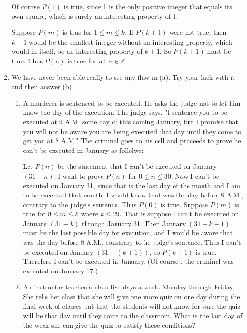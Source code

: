 \documentclass[10pt,letterpaper]{article}
\begin{document}
\begin{enumerate}
  Of course $P(1)$ is true, since 1 is the only positive integer that equals its own square, which is surely an interesting property of 1.
  
  Suppose $P(m)$ is true for $1 \le m \le k$. If $P(k+1)$ were not true, then $k+1$ would be the smallest integer without an interesting property, 
  which would in itself, be an interesting property of $k+1$. So $P(k+1)$ must be true. Thus $P(n)$ is true for all $n \in \mathbb{Z}^+$
  
  \item We have never been able really to see any flaw in (a). Try your luck with it and then answer (b)
  \begin{enumerate}
    \item A murderer is sentenced to be executed. He asks the judge not to let him know the day of the execution. The judge says, "I sentence you to be executed at 9 A.M. some day of this coming January, but I promise that you will not be aware you are being executed that day until they come to  get you at 8 A.M." The criminal goes to his cell and proceeds to prove he can't be executed in January as follolws:
  
    Let $P(n)$ be the statement that I can't be executed on  January $(31-n)$. I want to prove $P(n)$ for $0 \le n \le 30$. Now I can't be executed on January 31, since that is the last day of the month and I am to be executed that month, I would know that was the day before 8 A.M., contrary to the judge's sentence. Thus $P(0)$ is true. Suppose $P(m)$ is true for $0 \le m \le k$ where $k \le 29$. That is suppose I can't be executed on January $(31-k)$ through January 31. Then January $(31 - k -1)$ must be the last possible day for execution, and I would be  aware that was the day before 8 A.M., constrary to he judge's sentence. Thus I can't be executed on January $(31 - (k+1))$, so $P(k+1)$ is true. Therefore I can't be executed in January.
    (Of course , the criminal was executed on January 17.)
    
    \item An instructor teaches a class five days a week. Monday through Friday. She tells her class that she will give one more quiz on one day during the final week of classes but that the students will not know for sure the quiz will be that day until they come to the classroom. What is the last day of the week she can give the quiz to satisfy these conditions? 
  \end{enumerate}
  
  \end{enumerate}
\end{document}

